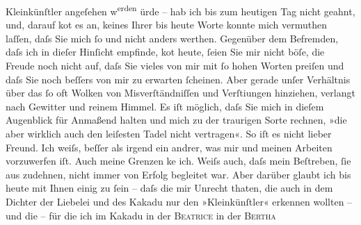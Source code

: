 \begin{ledgroupsized}[t]{13cm}
               Kleinkünſtler angeſehen w\substVorne{}\textsuperscript{erden }{\allowbreak}\substDazwischen{}ürde\substHinten{} – hab ich bis {\pb}zum heutigen Tag
               nicht geahnt, und, darauf ko{\geminationm}t es an, keines Ihrer \introOben{}bis heute\introOben{} Worte konnte mich vermuthen laſſen, daſs Sie mich ſo
               und nicht anders werthen. Gegenüber dem Befremden, daſs ich in dieſer Hinſicht
               empfinde, ko{\geminationm}t heute, ſeien Sie mir nicht böſe, die
               Freude noch nicht {\pb}auf, daſs Sie vieles von
               mir mit ſo hohen Worten preiſen und daſs Sie noch beſſers von mir zu erwarten
               ſcheinen. Aber gerade unſer Verhältnis \introOben{}über\introOben{} das ſo oft  Wolken von Misverſtändniſſen und Verſti{\geminationm}ungen hinziehen, verlangt nach Gewitter und reinem
               Himmel. Es iſt möglich, daſs Sie mich in dieſem Augenblick für {\pb}Anmaßend halten und mich zu der traurigen
               Sorte rechnen, »die aber wirklich auch den leiſesten Tadel nicht vertragen«. So iſt
               es nicht lieber Freund. Ich weiſs, beſſer als irgend ein andrer, was mir und meinen
               Arbeiten vorzuwerfen iſt. Auch meine Grenzen ke{\geminationn} ich.
               Weiſs auch, daſs mein Beſtreben, ſie aus {\pb}zudehnen, nicht immer von Erfolg begleitet war. Aber darüber glaubt ich bis heute
               mit Ihnen einig zu ſein – daſs die mir Unrecht thaten, die auch in dem Dichter der
                  Liebelei und des Kakadu nur den »Kleinkünſtler« erkennen wollten – und die –
               für die ich im Kakadu in der \textsc{Beatrice}{ }{\dotstwo} in der \textsc{Ber{\pb}tha
}
\end{ledgroupsized}
